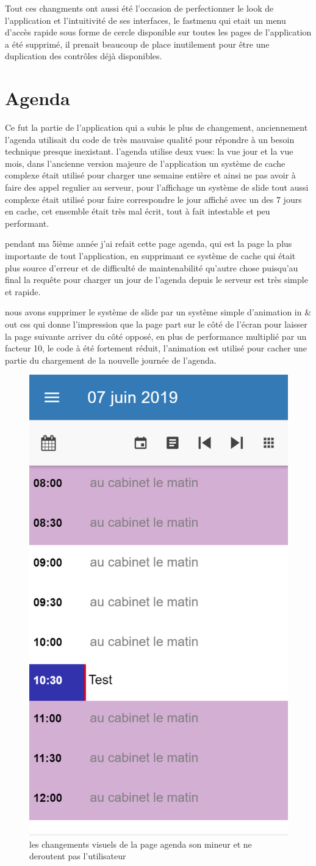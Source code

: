 Tout ces changments ont aussi été l'occasion de perfectionner le look de l'application 
et l'intuitivité de ses interfaces, le fastmenu qui etait un menu d'accès rapide sous 
forme de cercle disponible sur toutes les pages de l'application a été supprimé,
il prenait beaucoup de place inutilement pour être une duplication des contrôles 
déjà disponibles. \newline 

\section{Agenda}
Ce fut la partie de l'application qui a subis le plus de changement, anciennement l'agenda 
utilisait du code de très mauvaise qualité pour répondre à un besoin technique presque inexistant.
l'agenda utilise deux vues: la vue jour et la vue mois, dans l'ancienne version majeure
de l'application un système de cache complexe était utilisé pour charger une semaine entière 
et ainsi ne pas avoir à faire des appel regulier au serveur, pour l'affichage 
un système de slide tout aussi complexe était utilisé pour faire correspondre le jour affiché 
avec un des 7 jours en cache, cet ensemble était très mal écrit, tout à fait intestable 
et peu performant. \newline

pendant ma 5ième année j'ai refait cette page agenda, qui est la page la plus importante 
de tout l'application, en supprimant ce système de cache qui était plus source d'erreur 
et de difficulté de maintenabilité qu'autre chose puisqu'au final la requête pour charger 
un jour de l'agenda depuis le serveur est très simple et rapide. \newline

nous avons supprimer le système de slide par un système simple d'animation in \& out css 
qui donne l'impression que la page part sur le côté de l'écran pour laisser la page suivante
arriver du côté opposé, en plus de performance multiplié par un facteur 10, le code à été 
fortement réduit, l'animation est utilisé pour cacher une partie du chargement de la
nouvelle journée de l'agenda. \newline

\begin{figure}[!h]
	\centering
	\includegraphics[width=0.3\linewidth]{Images/agenda}
	\caption{les changements visuels de la page agenda son mineur et ne deroutent pas l'utilisateur }
	\label{fig:archhexa}
\end{figure}

